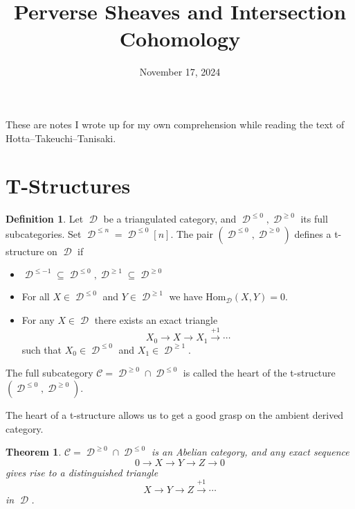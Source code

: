 \documentclass[letterpaper, 12pt]{article}
\title{Perverse Sheaves and Intersection Cohomology}
\date{November 17, 2024}
\newcommand{\Hom}{\text{Hom}}
\DeclareMathOperator{\D}{\mathcal{D}}
\newtheorem{theorem}{Theorem}
\theoremstyle{definition}
\newtheorem{definition}{Definition}
\theoremstyle{remark}
\begin{document}
\maketitle

These are notes I wrote up for my own comprehension while reading the text of Hotta--Takeuchi--Tanisaki.

\section{T-Structures}
\begin{definition}
    Let $\D$ be a triangulated category, and $\D^{\leq 0}, \D^{\geq 0}$ its full subcategories. Set $\D^{\leq n} = \D^{\leq 0}[n]$. The pair $(\D^{\leq 0}, \D^{\geq 0})$ defines a t-structure on $\D$ if
    \begin{itemize}
        \item $\D^{\leq -1} \subseteq \D^{\leq 0}, \D^{\geq 1} \subseteq \D^{\geq 0}$
        \item For all $X \in \D^{\leq 0}$ and $Y \in \D^{\geq 1}$ we have $\Hom_{\D}(X, Y) = 0.$
        \item For any $X \in \D$ there exists an exact triangle
        \begin{equation}
            X_0 \to X \to X_1 \overset{+1}{\to} \cdots
        \end{equation}
        such that $X_0 \in \D^{\leq 0}$ and $X_1 \in \D^{\geq 1}$.
    \end{itemize}
    The full subcategory $\mathcal{C} = \D^{\geq 0} \cap \D^{\leq 0}$ is called the heart of the t-structure $(\D^{\leq 0}, \D^{\geq 0})$.
\end{definition}

The heart of a t-structure allows us to get a good grasp on the ambient derived category.
\begin{theorem}
    $\mathcal{C} = \D^{\geq 0} \cap \D^{\leq 0}$ is an Abelian category, and any exact sequence
    \begin{equation*}
        0 \to X \to Y \to Z \to 0
    \end{equation*}
    gives rise to a distinguished triangle
    \begin{equation*}
        X \to Y \to Z \overset{+1}{\to} \cdots
    \end{equation*}
    in $\D$.
\end{theorem}
\end{document}
